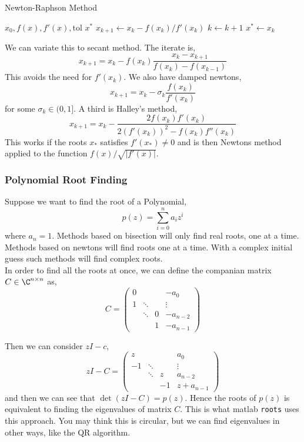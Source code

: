 \begin{algorithm}
\caption{Newton-Raphson Method}\label{alg:NR}
\begin{algorithmic}
\Require $x_0, f(x), f'(x), \mathrm{tol}$
\Ensure $x^*$
\State $x_{k+1} \gets x_k - f(x_k)/f'(x_k)$
\State $k \gets k + 1$
\EndWhile
\State $x^* \gets x_k$
\end{algorithmic}
\end{algorithm}

We can variate this to secant method. The iterate is,
$$ x_{k+1} = x_k - f(x_k)\frac{x_k - x_{k+1}}{f(x_k) - f(x_{k-1})} $$
This avoids the need for $f'(x_k)$. We also have damped newtons,
$$ x_{k+1} = x_k - \sigma_k \frac{f(x_k)}{f'(x_k)} $$
for some $\sigma_k \in (0, 1]$. A third is Halley's method,
$$ x_{k+1} = x_k - \frac{2f(x_k)f'(x_k)}{2(f'(x_k))^2 - f(x_k)f''(x_k)} $$
This works if the roots $x_*$ satisfies $f'(x_*) \ne 0$ and is then Newtons method applied to the function $f(x) / \sqrt{|f'(x)|}$.

\subsubsection{Polynomial Root Finding}
Suppose we want to find the root of a Polynomial,
$$ p(z) = \sum_{i=0}^n a_i z^i $$
where $a_n = 1$. Methods based on bisection will only find real roots, one at a time. Methods based on newtons will find roots one at a time. With a complex initial guess such methods will find complex roots.\\

\noindent
In order to find all the roots at once, we can define the companian matrix $C \in \C^{n\times n}$ as,
$$ C = \begin{pmatrix}
  0 &&& -a_0 \\
  1 & \ddots && \vdots \\
  & \ddots & 0 & -a_{n-2} \\
  && 1 & -a_{n-1}
\end{pmatrix} $$

Then we can consider $zI - c$,
$$ zI - C = \begin{pmatrix}
  z &&& a_0 \\
  -1 & \ddots && \vdots \\
  & \ddots & z & a_{n-2} \\
  && -1 & z+a_{n-1}
\end{pmatrix} $$
and then we can see that $\det (zI - C) = p(z)$. Hence the roots of $p(z)$ is equivalent to finding the eigenvalues of matrix $C$. This is what matlab \texttt{roots} uses this approach. You may think this is circular, but we can find eigenvalues in other ways, like the QR algorithm.

